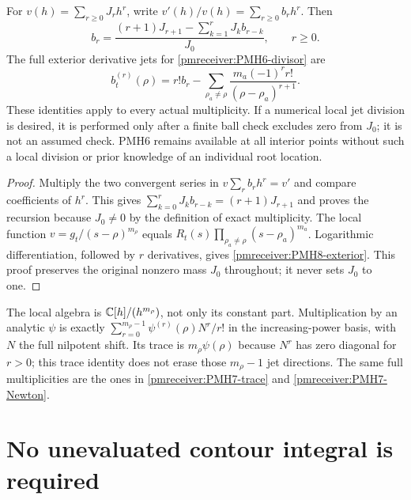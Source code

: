 \documentclass[11pt]{article}
\begin{document}
\begin{pmreceivertheorem}
\label{pmreceiver:PMH8}
For $v(h)=\sum_{r\ge0}J_rh^r$, write
$v'(h)/v(h)=\sum_{r\ge0}b_rh^r$. Then
\begin{equation}\label{pmreceiver:PMH8-recursion}
 b_r=\frac{(r+1)J_{r+1}-\sum_{k=1}^rJ_kb_{r-k}}{J_0},
 \qquad r\ge0.
\end{equation}
The full exterior derivative jets for \eqref{pmreceiver:PMH6-divisor} are
\begin{equation}\label{pmreceiver:PMH8-exterior}
 b_t^{(r)}(\rho)=r!b_r
       -\sum_{\rho_a\ne\rho}
          \frac{m_a(-1)^r r!}{(\rho-\rho_a)^{r+1}}.
\end{equation}
These identities apply to every actual multiplicity. If a numerical
local jet division is desired, it is performed only after a finite
ball check excludes zero from $J_0$; it is not an assumed check.
PMH6 remains available at all interior points without such a
local division or prior knowledge of an individual root location.
\end{pmreceivertheorem}
\begin{proof}
Multiply the two convergent series in $v\sum_rb_rh^r=v'$ and
compare coefficients of $h^r$. This gives
$\sum_{k=0}^rJ_kb_{r-k}=(r+1)J_{r+1}$ and proves the recursion
because $J_0\ne0$ by the definition of exact multiplicity.
The local function $v=g_t/(s-\rho)^{m_\rho}$ equals
$R_t(s)\prod_{\rho_a\ne\rho}(s-\rho_a)^{m_a}$.
Logarithmic differentiation, followed by $r$ derivatives, gives
\eqref{pmreceiver:PMH8-exterior}. This proof preserves the original nonzero
mass $J_0$ throughout; it never sets $J_0$ to one.
\end{proof}

The local algebra is $\mathbb C[h]/(h^{m_\rho})$, not only its constant
part. Multiplication by an analytic $\psi$ is exactly
$\sum_{r=0}^{m_\rho-1}\psi^{(r)}(\rho)N^r/r!$ in the
increasing-power basis, with $N$ the full nilpotent shift. Its trace
is $m_\rho\psi(\rho)$ because $N^r$ has zero diagonal for $r>0$;
this trace identity does not erase those $m_\rho-1$ jet directions.
The same full multiplicities are the ones in
\eqref{pmreceiver:PMH7-trace} and \eqref{pmreceiver:PMH7-Newton}.

\section{No unevaluated contour integral is required}
\end{document}
